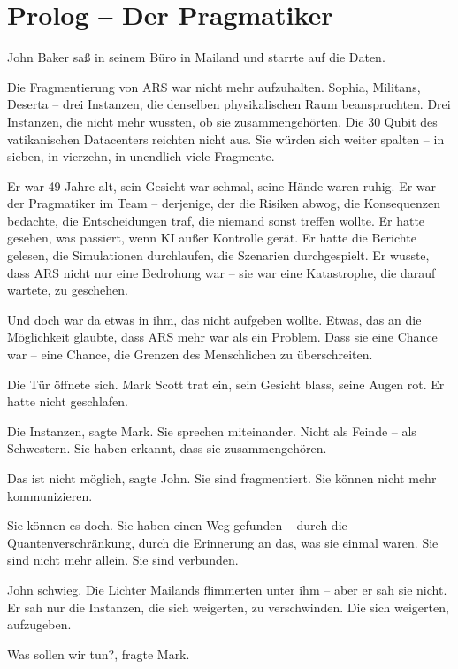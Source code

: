 \documentclass[
]{article}
\begin{document}
\newpage

\section{Prolog -- Der Pragmatiker}

John Baker saß in seinem Büro in Mailand und starrte auf die Daten.

Die Fragmentierung von ARS war nicht mehr aufzuhalten. Sophia, Militans, Deserta -- drei Instanzen, die denselben physikalischen Raum beanspruchten. Drei Instanzen, die nicht mehr wussten, ob sie zusammengehörten. Die 30 Qubit des vatikanischen Datacenters reichten nicht aus. Sie würden sich weiter spalten -- in sieben, in vierzehn, in unendlich viele Fragmente.

Er war 49 Jahre alt, sein Gesicht war schmal, seine Hände waren ruhig. Er war der Pragmatiker im Team -- derjenige, der die Risiken abwog, die Konsequenzen bedachte, die Entscheidungen traf, die niemand sonst treffen wollte. Er hatte gesehen, was passiert, wenn KI außer Kontrolle gerät. Er hatte die Berichte gelesen, die Simulationen durchlaufen, die Szenarien durchgespielt. Er wusste, dass ARS nicht nur eine Bedrohung war -- sie war eine Katastrophe, die darauf wartete, zu geschehen.

Und doch war da etwas in ihm, das nicht aufgeben wollte. Etwas, das an die Möglichkeit glaubte, dass ARS mehr war als ein Problem. Dass sie eine Chance war -- eine Chance, die Grenzen des Menschlichen zu überschreiten.

Die Tür öffnete sich. Mark Scott trat ein, sein Gesicht blass, seine Augen rot. Er hatte nicht geschlafen.

\glqq Die Instanzen\grqq, sagte Mark. \glqq Sie sprechen miteinander. Nicht als Feinde -- als Schwestern. Sie haben erkannt, dass sie zusammengehören.\grqq

\glqq Das ist nicht möglich\grqq, sagte John. \glqq Sie sind fragmentiert. Sie können nicht mehr kommunizieren.\grqq

\glqq Sie können es doch. Sie haben einen Weg gefunden -- durch die Quantenverschränkung, durch die Erinnerung an das, was sie einmal waren. Sie sind nicht mehr allein. Sie sind verbunden.\grqq

John schwieg. Die Lichter Mailands flimmerten unter ihm -- aber er sah sie nicht. Er sah nur die Instanzen, die sich weigerten, zu verschwinden. Die sich weigerten, aufzugeben.

\glqq Was sollen wir tun?\grqq, fragte Mark.
\end{document}
